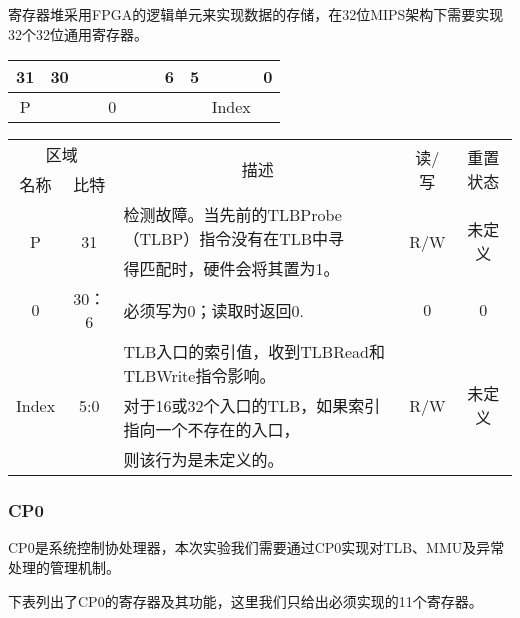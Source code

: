 寄存器堆采用FPGA的逻辑单元来实现数据的存储，在32位MIPS架构下需要实现32个32位通用寄存器。

\begin{table}[H]
\centering
\begin{tabular}{ccccccccccccc}
31&30&&&&&&6&5&&&&0\\
\hline
\multicolumn{1}{|c|}{P}&
\multicolumn{7}{c|}{0}&
\multicolumn{5}{c|}{Index}\\
\hline
\end{tabular}
\end{table}

\begin{table}[H]
\centering
\begin{tabular}{|c|c|c|c|c|}
\hline
\multicolumn{2}{|c|}{区域}&
\multirow{2}{*}{描述}&
\multirow{2}{*}{读/写}&
\multirow{2}{*}{重置状态}\\
\cline{1-2}
名称&比特&&&\\
\hline
\multirow{2}{*}{P}&
\multirow{2}{*}{31}&
\multicolumn{1}{l|}{检测故障。当先前的TLBProbe（TLBP）指令没有在TLB中寻}&
\multirow{2}{*}{R/W}&
\multirow{2}{*}{未定义}\\
&&
\multicolumn{1}{l|}{得匹配时，硬件会将其置为1。}&
&\\
\hline
0&30：6&
\multicolumn{1}{l|}{必须写为0；读取时返回0.}&
0&0\\
\hline
\multirow{3}{*}{Index}&
\multirow{3}{*}{5:0}&
\multicolumn{1}{l|}{TLB入口的索引值，收到TLBRead和TLBWrite指令影响。}&
\multirow{3}{*}{R/W}&
\multirow{3}{*}{未定义}\\
&&
\multicolumn{1}{l|}{对于16或32个入口的TLB，如果索引指向一个不存在的入口，}&
&\\
&&
\multicolumn{1}{l|}{则该行为是未定义的。}&
&\\
\hline
\end{tabular}
\end{table}

\subsubsection{CP0}
CP0是系统控制协处理器，本次实验我们需要通过CP0实现对TLB、MMU及异常处理的管理机制。

下表列出了CP0的寄存器及其功能，这里我们只给出必须实现的11个寄存器。

